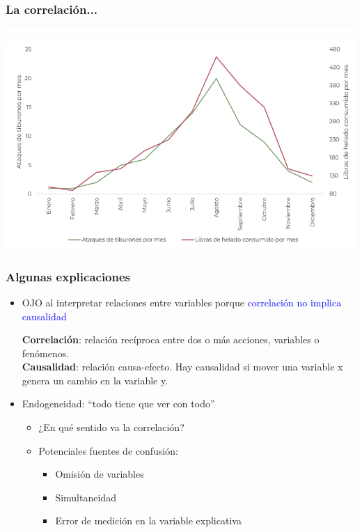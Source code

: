 \documentclass{beamer}
\begin{document}
\begin{frame}
\frametitle{La correlación...}
\begin{center}
    \includegraphics[scale=0.55]{../Figures/C2.13.png}
\end{center}
\end{frame}

\begin{frame}
    \frametitle{Algunas explicaciones}
    \begin{itemize}
        \item OJO al interpretar relaciones entre variables porque \textcolor{blue}{correlación no implica causalidad} 
        \begin{boxB}
        \textbf{Correlación}: relación recíproca entre dos o más acciones, variables o fenómenos. \\
        \textbf{Causalidad}: relación causa-efecto. Hay causalidad si mover una variable x genera un cambio en la variable y.
        \end{boxB}
        \item Endogeneidad: ``todo tiene que ver con todo'' \vspace{1mm}
        \begin{itemize} 
         \item ¿En qué sentido va la correlación?
            \item Potenciales fuentes de confusión:
            \begin{itemize}
                \item {Omisión de variables}  
                \item {Simultaneidad} 
                \item {Error de medición en la variable explicativa}
            \end{itemize}
        \end{itemize}
    \end{itemize}
\end{frame}
\end{document}
